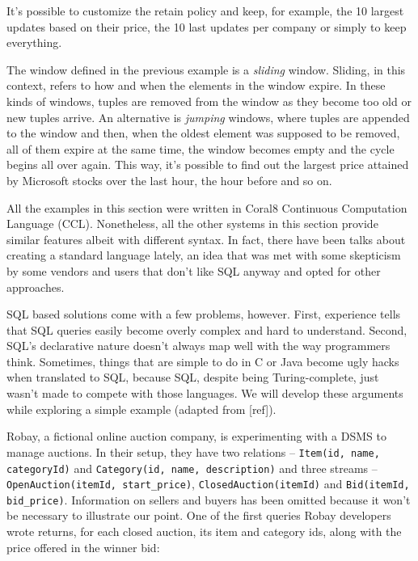 \documentclass{report}
\begin{document}
It's possible to customize the retain policy and keep, for example,
the 10 largest updates based on their price, the 10 last updates per
company or simply to keep everything.

The window defined in the previous example is a \emph{sliding}
window. Sliding, in this context, refers to how and when the elements
in the window expire. In these kinds of windows, tuples are removed
from the window as they become too old or new tuples arrive. An
alternative is \emph{jumping} windows, where tuples are appended to
the window and then, when the oldest element was supposed to be
removed, all of them expire at the same time, the window becomes empty
and the cycle begins all over again. This way, it's possible to find
out the largest price attained by Microsoft stocks over the last hour,
the hour before and so on.

All the examples in this section were written in Coral8 Continuous
Computation Language (CCL). Nonetheless, all the other systems in this
section provide similar features albeit with different syntax. In
fact, there have been talks about creating a standard language lately,
an idea that was met with some skepticism by some vendors and users
that don't like SQL anyway and opted for other approaches.

SQL based solutions come with a few problems, however. First,
experience tells that SQL queries easily become overly complex and
hard to understand. Second, SQL's declarative nature doesn't always
map well with the way programmers think. Sometimes, things that are
simple to do in C or Java become ugly hacks when translated to SQL,
because SQL, despite being Turing-complete, just wasn't made to
compete with those languages. We will develop these arguments while
exploring a simple example (adapted from [ref]).

Robay, a fictional online auction company, is experimenting with a
DSMS to manage auctions. In their setup, they have two relations --
\verb=Item(id, name, categoryId)= and
\verb=Category(id, name, description)= and three streams --
\verb=OpenAuction(itemId, start_price)=, \verb=ClosedAuction(itemId)=
and \verb=Bid(itemId, bid_price)=. Information on sellers and buyers
has been omitted because it won't be necessary to illustrate our
point. One of the first queries Robay developers wrote returns, for
each closed auction, its item and category ids, along with the price
offered in the winner bid:
\end{document}
